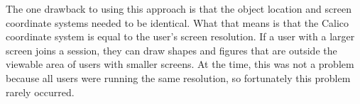 The one drawback to using this approach is that the object location and screen coordinate systems needed to be identical. What that means is that the Calico coordinate system is equal to the user's screen resolution. If a user with a larger screen joins a session, they can draw shapes and figures that are outside the viewable area of users with smaller screens. At the time, this was not a problem because all users were running the same resolution, so fortunately this problem rarely occurred.
